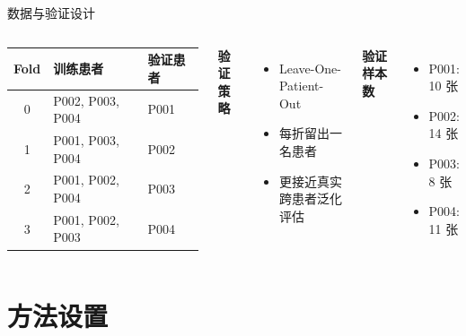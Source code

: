 \documentclass[
  presentation,
  titlegraphic=./images/bit_logo.pdf,
  framelogo=./images/bit_logo.pdf
]{bitbeamer}
\begin{document}
\begin{frame}[t]{数据与验证设计}
  \begin{columns}[T,onlytextwidth]
    \begin{table}
      \centering
      \small
      \begin{tabular}{cll}
        \toprule
        Fold & 训练患者 & 验证患者 \\
        \midrule
        0 & P002, P003, P004 & P001 \\
        1 & P001, P003, P004 & P002 \\
        2 & P001, P002, P004 & P003 \\
        3 & P001, P002, P003 & P004 \\
        \bottomrule
      \end{tabular}
    \end{table}

    \textbf{验证策略}
    \begin{itemize}
      \item Leave-One-Patient-Out
      \item 每折留出一名患者
      \item 更接近真实跨患者泛化评估
    \end{itemize}

    \vspace{0.25cm}

    \textbf{验证样本数}
    \begin{itemize}
      \item P001: 10 张
      \item P002: 14 张
      \item P003: 8 张
      \item P004: 11 张
    \end{itemize}
  \end{columns}
\end{frame}

\section{方法设置}
\end{document}
